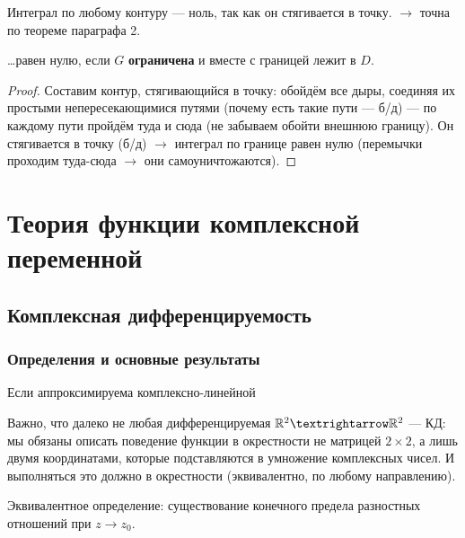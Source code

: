 \documentclass[12pt, a4paper, oneside]{memoir}
\begin{document}
\begin{theorem}
    Интеграл по любому контуру — ноль, так как он стягивается в точку. $→$ точна по теореме параграфа 2.
\end{theorem}


\begin{theorem}

    …равен нулю, если $G$ \textbf{ограничена} и вместе с границей лежит в $D$.

    \begin{proof}
        Составим контур, стягивающийся в точку: обойдём все дыры,
        соединяя их простыми непересекающимися путями (почему есть такие пути — б/д) 
        — по каждому пути пройдём туда и сюда (не забываем обойти внешнюю границу).
        Он стягивается в точку (б/д) $→$ интеграл по границе равен нулю (перемычки проходим туда-сюда $→$ они самоуничтожаются).
    \end{proof}
\end{theorem}

\chapter{Теория функции комплексной переменной}

\section{Комплексная дифференцируемость}

\subsection{Определения и основные результаты}

\begin{definition}

    Если аппроксимируема комплексно-линейной
\end{definition}

Важно, что далеко не любая дифференцируемая $\sR^2 → \sR^2$ — КД:
мы обязаны описать поведение функции в окрестности не матрицей $2×2$, 
а лишь двумя координатами, которые подставляются в умножение комплексных чисел.
И выполняться это должно в окрестности (эквивалентно, по любому направлению).

\begin{remark}
    Эквивалентное определение: существование конечного предела разностных отношений при $z → z_0$.
\end{remark}
\end{document}
